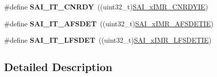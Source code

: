 \begin{DoxyCompactItemize}
\item 
\#define {\bfseries S\+A\+I\+\_\+\+I\+T\+\_\+\+C\+N\+R\+DY}~((uint32\+\_\+t)\hyperlink{group___peripheral___registers___bits___definition_ga16c51a8eacd28e521cf3da6d3a427a32}{S\+A\+I\+\_\+x\+I\+M\+R\+\_\+\+C\+N\+R\+D\+Y\+IE})\hypertarget{group___s_a_i___block___interrupts___definition_ga228396442f25488a66b8d9f0d14b6c4c}{}\label{group___s_a_i___block___interrupts___definition_ga228396442f25488a66b8d9f0d14b6c4c}

\item 
\#define {\bfseries S\+A\+I\+\_\+\+I\+T\+\_\+\+A\+F\+S\+D\+ET}~((uint32\+\_\+t)\hyperlink{group___peripheral___registers___bits___definition_ga5aef4af228a1ce820c6d83615aa5cd5c}{S\+A\+I\+\_\+x\+I\+M\+R\+\_\+\+A\+F\+S\+D\+E\+T\+IE})\hypertarget{group___s_a_i___block___interrupts___definition_gaa0e77f56c01a38570e479374ebe1a488}{}\label{group___s_a_i___block___interrupts___definition_gaa0e77f56c01a38570e479374ebe1a488}

\item 
\#define {\bfseries S\+A\+I\+\_\+\+I\+T\+\_\+\+L\+F\+S\+D\+ET}~((uint32\+\_\+t)\hyperlink{group___peripheral___registers___bits___definition_ga1ac59347c7f574af79b586a793b2160f}{S\+A\+I\+\_\+x\+I\+M\+R\+\_\+\+L\+F\+S\+D\+E\+T\+IE})\hypertarget{group___s_a_i___block___interrupts___definition_ga37d01f0fb76c15d484b3554a3eca6569}{}\label{group___s_a_i___block___interrupts___definition_ga37d01f0fb76c15d484b3554a3eca6569}

\end{DoxyCompactItemize}


\subsection{Detailed Description}
